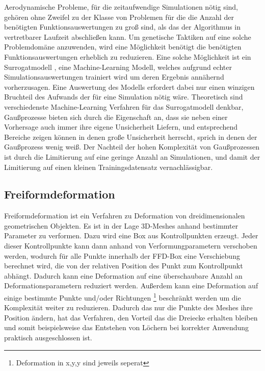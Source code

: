 \documentclass[12pt]{article}
\begin{document}
Aerodynamische Probleme, für die zeitaufwendige Simulationen nötig sind, gehören ohne Zweifel zu der Klasse von Problemen für die die Anzahl der benötigten Funktionsauswertungen zu groß sind, als das der Algorithmus in vertretbarer Laufzeit abschließen kann.
Um genetische Taktiken auf eine solche Problemdomäne anzuwenden, wird eine Möglichkeit benötigt die benötigten Funktionsauswertungen erheblich zu reduzieren.
Eine solche Möglichkeit ist ein Surrogatmodell \cite{Jin.2011}\cite{Preen.2016}, eine Machine-Learning Modell, welches aufgrund echter Simulationsauswertungen trainiert wird um deren Ergebnis annähernd vorherzusagen.
Eine Auswertung des Modells erfordert dabei nur einen winzigen Bruchteil des Aufwands der für eine Simulation nötig wäre.
Theoretisch sind verschiedenste Machine-Learning Verfahren für das Surrogatmodell denkbar, Gaußprozesse bieten sich durch die Eigenschaft an, dass sie neben einer Vorhersage auch immer ihre eigene Unsicherheit Liefern, und entsprechend Bereiche zeigen können in denen große Unsicherheit herrscht, sprich in denen der Gaußprozess wenig weiß.
Der Nachteil der hohen Komplexität von Gaußprozessen  ist durch die Limitierung auf eine geringe Anzahl an Simulationen, und damit der Limitierung auf einen kleinen Trainingsdatensatz vernachlässigbar.

\subsection{Freiformdeformation}

Freiformdeformation\cite{Sederberg.1986} ist ein Verfahren zu Deformation von dreidimensionalen geometrischen Objekten.
Es ist in der Lage 3D-Meshes anhand bestimmter Parameter zu verformen.
Dazu wird eine Box aus Kontrollpunkten erzeugt.
Jeder dieser Kontrollpunkte kann dann anhand von Verformungparametern verschoben werden, wodurch für alle Punkte innerhalb der FFD-Box eine Verschiebung berechnet wird, die von der relativen Position des Punkt zum Kontrollpunkt abhängt.
Dadurch kann eine Deformation auf eine überschaubare Anzahl an Deformationsparametern reduziert werden.
Außerdem kann eine Deformation auf einige bestimmte Punkte und/oder Richtungen
\footnote{Deformation in x,y,y sind jeweils seperat} 
beschränkt werden um die Komplexität weiter zu reduzieren.
Dadurch das nur die Punkte des Meshes ihre Position ändern, hat das Verfahren, den Vorteil das die Dreiecke erhalten bleiben und somit beispielsweise das Entstehen von Löchern bei korrekter Anwendung praktisch ausgeschlossen ist.
\end{document}
